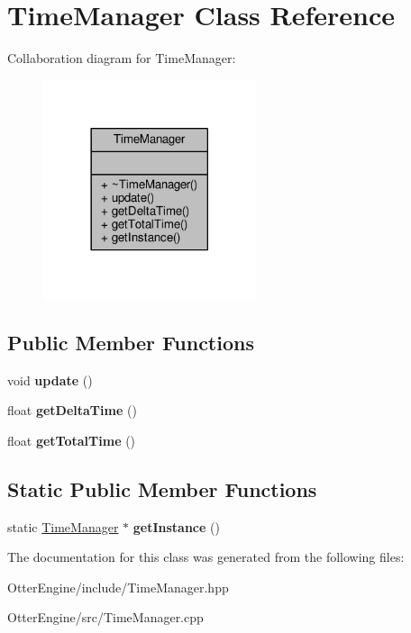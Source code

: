 \hypertarget{class_time_manager}{}\section{Time\+Manager Class Reference}
\label{class_time_manager}


Collaboration diagram for Time\+Manager\+:\nopagebreak
\begin{figure}[H]
\begin{center}
\leavevmode
\includegraphics[width=177pt]{d1/de9/class_time_manager__coll__graph}
\end{center}
\end{figure}
\subsection*{Public Member Functions}
\begin{DoxyCompactItemize}
\item 
void {\bfseries update} ()\hypertarget{class_time_manager_a97d902b19861efc099141eeb846671a3}{}\label{class_time_manager_a97d902b19861efc099141eeb846671a3}

\item 
float {\bfseries get\+Delta\+Time} ()\hypertarget{class_time_manager_a2988db092cf10d939549b36d4135a224}{}\label{class_time_manager_a2988db092cf10d939549b36d4135a224}

\item 
float {\bfseries get\+Total\+Time} ()\hypertarget{class_time_manager_a0ea7c2dbfe1fb11c7f1de801ffcd4d37}{}\label{class_time_manager_a0ea7c2dbfe1fb11c7f1de801ffcd4d37}

\end{DoxyCompactItemize}
\subsection*{Static Public Member Functions}
\begin{DoxyCompactItemize}
\item 
static \hyperlink{class_time_manager}{Time\+Manager} $\ast$ {\bfseries get\+Instance} ()\hypertarget{class_time_manager_af87e29622c00b3c724312b54751e8bac}{}\label{class_time_manager_af87e29622c00b3c724312b54751e8bac}

\end{DoxyCompactItemize}


The documentation for this class was generated from the following files\+:\begin{DoxyCompactItemize}
\item 
Otter\+Engine/include/Time\+Manager.\+hpp\item 
Otter\+Engine/src/Time\+Manager.\+cpp\end{DoxyCompactItemize}
